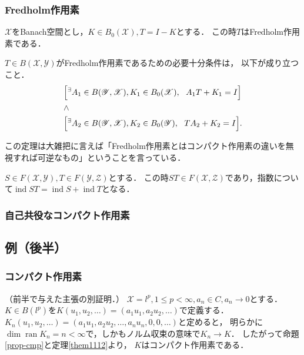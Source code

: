 \documentclass[a4j]{jsarticle}
\newcommand{\ran}{\operatorname{ran}}
\newcommand{\ind}{\operatorname{ind}}
\newcommand{\spX}{\mathscr{X}}
\newcommand{\spY}{\mathscr{Y}}
\newcommand{\spZ}{\mathscr{Z}}
\begin{document}
    \subsubsection{Fredholm作用素}
    \begin{Them}[定理11.20, p.262] \label{them1120}
        $\spX$をBanach空間とし，$K \in B_0(\spX), T=I-K$とする．
        この時$T$はFredholm作用素である．
    \end{Them}
    \begin{Them}[定理11.24, p.264] \label{them1124}
        $T \in B(\spX,\spY)$がFredholm作用素であるための必要十分条件は，
        以下が成り立つこと．
        \begin{align*}
            &\Big[\Exists{A_1 \in B(\spY,\spX), K_1 \in B_0(\spX)} A_1 T+K_1=I \Big] \\
            &\land \\
            &\Big[\Exists{A_2 \in B(\spY,\spX), K_2 \in B_0(\spY)} T A_2+K_2=I \Big]
            .
        \end{align*}
    \end{Them}
    この定理は大雑把に言えば「Fredholm作用素とはコンパクト作用素の違いを無視すれば可逆なもの」ということを言っている．

    \begin{Them}[定理11.25, p.265] \label{them1125}
        $S \in F(\spX, \spY), T \in F(\spY,\spZ)$とする．
        この時$ST \in F(\spX,\spZ)$であり，指数について$\ind ST=\ind S+\ind T$となる．
    \end{Them}

    \subsubsection{自己共役なコンパクト作用素}

    \subsection{例（後半）}
    \subsubsection{コンパクト作用素}
    \begin{Example}[問, p.258]
        （前半で与えた主張の別証明．）
        $\spX=l^p, 1 \leq p<\infty, a_n \in C, a_n \to 0$とする．
        $K \in B(l^p)$を$K(u_1,u_2,\dots)=(a_1u_1,a_2u_2,\dots)$で定義する．
        $K_n(u_1,u_2,\dots)=(a_1u_1,a_2u_2,\dots,a_nu_n,0,0,\dots)$と定めると，
        明らかに$\dim \ran K_n=n<\infty$で，しかもノルム収束の意味で$K_n \to K$．
        したがって命題\ref{prop-cmp}と定理\ref{them1112}より，
        $K$はコンパクト作用素である．
    \end{Example}
\end{document}
